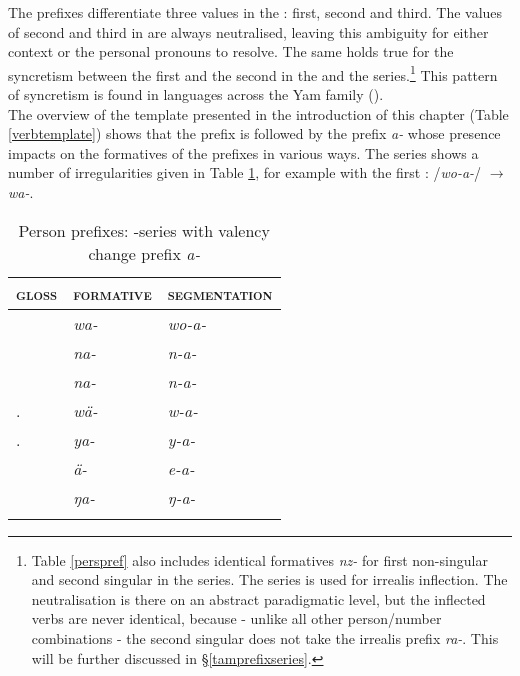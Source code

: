 The prefixes differentiate three  values in the : first, second and third. The values of second and third  in  are always neutralised, leaving this ambiguity for either context or the personal pronouns to resolve. The same holds true for the syncretism between the first  and the second  in the \Alph{} and the \Gam{} series.\footnote{Table \ref{perspref} also includes identical formatives \emph{nz-} for first non-singular and second singular in the \Bet{} series. The \Bet{} series is used for irrealis inflection. The neutralisation is there on an abstract paradigmatic level, but the inflected verbs are never identical, because - unlike all other person/number combinations - the second singular does not take the irrealis prefix \emph{ra-}. This will be further discussed in \S{}\ref{tamprefixseries}.} This pattern of syncretism is found in languages across the Yam family (\citealt{Evans:sng}).\\

The overview of the  template presented in the introduction of this chapter (Table \ref{verbtemplate}) shows that the  prefix is followed by the  prefix \emph{a-} whose presence impacts on the formatives of the  prefixes in various ways. The \Alph{} series shows a number of irregularities given in Table \ref{persprefwithvalencychange}, for example with the first : /\emph{wo-a-}/ $\rightarrow$ \emph{wa-}.

\begin{table}
\caption{Person prefixes: \Alph-series with valency change prefix \emph{a-}}
\label{persprefwithvalencychange}
	\begin{tabular}{lll}
		\lsptoprule
		\textsc{gloss} &\textsc{formative} &\textsc{segmentation}\\\hline
		\Fsg &\emph{wa-} &\emph{wo-a-}\\
		\Fnsg &\emph{na-} &\emph{n-a-}\\
		\Ssg &\emph{na-} &\emph{n-a-}\\
		\Tsg.\F	&\emph{wä-} &\emph{w-a-}\\
		\Tsg.\Masc &\emph{ya-} &\emph{y-a-}\\
		\Stnsg &\emph{ä-} &\emph{e-a-}\footnotemark\\
		\M &\emph{ŋa-} &\emph{ŋ-a-}\\
		\lspbottomrule
	\end{tabular}
\end{table}%

